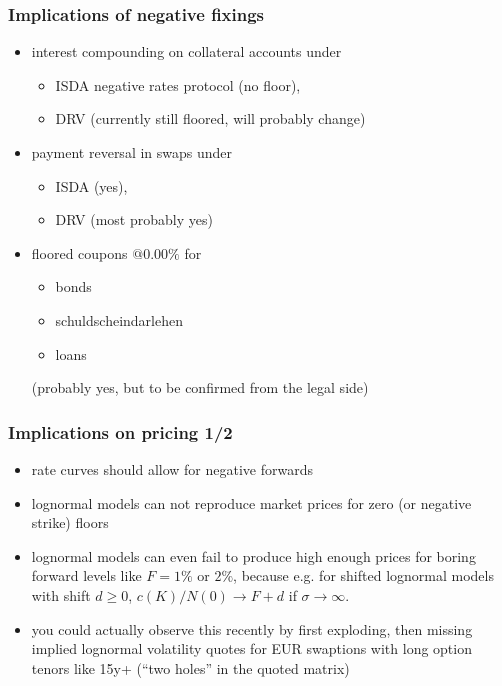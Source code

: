 \documentclass[10pt,German]{beamer}
\begin{document}
\begin{frame}[fragile]
\frametitle{Implications of negative fixings}
\begin{itemize}
\item interest compounding on collateral accounts under
\begin{itemize}
\item ISDA negative rates protocol (no floor),
\item DRV (currently still floored, will probably change)
\end{itemize}
\item payment reversal in swaps under 
\begin{itemize}
\item ISDA (yes),
\item DRV (most probably yes)
\end{itemize}
\item floored coupons $@0.00\%$ for 
\begin{itemize}
\item bonds 
\item schuldscheindarlehen
\item loans
\end{itemize}
(probably yes, but to be confirmed from the legal side)
\end{itemize}
\end{frame}

\begin{frame}[fragile]
\frametitle{Implications on pricing 1/2}
\begin{itemize}
\item rate curves should allow for negative forwards
\item lognormal models can not reproduce market prices for zero (or negative strike) floors
\item lognormal models can even fail to produce high enough prices for boring forward levels like $F=1\%$ or $2\%$, because e.g. for shifted lognormal models with shift $d\geq0$, $c(K)/N(0)\rightarrow F+d$ if $\sigma\rightarrow\infty$. 
\item you could actually observe this recently by first exploding, then missing implied lognormal volatility quotes for EUR swaptions with long option tenors like 15y+ (``two holes'' in the quoted matrix)
\end{itemize}
\end{frame}
\end{document}
